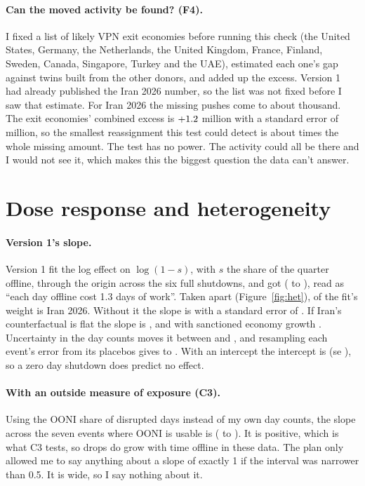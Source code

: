 \documentclass[11pt]{article}
\begin{document}
\paragraph{Can the moved activity be found? (F4).} I fixed a list of likely VPN exit economies before running this check (the United States, Germany, the Netherlands, the United Kingdom, France, Finland, Sweden, Canada, Singapore, Turkey and the UAE), estimated each one's gap against twins built from the other donors, and added up the excess. Version 1 had already published the Iran 2026 number, so the list was not fixed before I saw that estimate. For Iran 2026 the missing pushes come to about \vpnmissing{} thousand. The exit economies' combined excess is $+1.2$ million with a standard error of \vpnse{} million, so the smallest reassignment this test could detect is about \vpnmde{} times the whole missing amount. The test has no power. The activity could all be there and I would not see it, which makes this the biggest question the data can't answer.

\section{Dose response and heterogeneity}

\paragraph{Version 1's slope.} Version 1 fit the log effect on $\log(1-s)$, with $s$ the share of the quarter offline, through the origin across the six full shutdowns, and got \dosebeta{} (\doselo{} to \dosehi), read as ``each day offline cost 1.3 days of work''. Taken apart (Figure~\ref{fig:het}), \doseinfluence{} of the fit's weight is Iran 2026. Without it the slope is \dosewithout{} with a standard error of \dosewithoutse. If Iran's counterfactual is flat the slope is \doseflat, and with sanctioned economy growth \dosesancgrowth. Uncertainty in the day counts moves it between \dosedayslo{} and \dosedayshi, and resampling each event's error from its placebos gives \dosebootlo{} to \doseboothi. With an intercept the intercept is \doseintercept{} (se \doseinterceptse), so a zero day shutdown does predict no effect.

\paragraph{With an outside measure of exposure (C3).} Using the OONI share of disrupted days instead of my own day counts, the slope across the seven events where OONI is usable is \cthreebeta{} (\cthreelo{} to \cthreehi). It is positive, which is what C3 tests, so drops do grow with time offline in these data. The plan only allowed me to say anything about a slope of exactly 1 if the interval was narrower than 0.5. It is \cthreewidth{} wide, so I say nothing about it.
\end{document}
